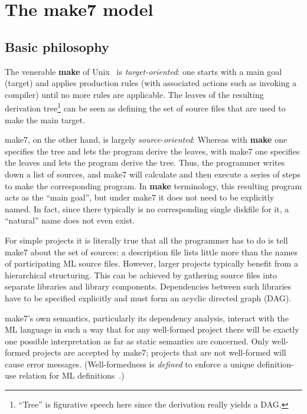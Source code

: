 
\section{The make7 model}

\subsection{Basic philosophy}

The venerable {\bf make} of Unix~\cite{feldman79} is {\em
target-oriented}\/: one starts with a main goal (target) and applies
production rules (with associated actions such as invoking a compiler)
until no more rules are applicable. The leaves of the resulting
derivation tree\footnote{``Tree'' is figurative speech here since the
derivation really yields a DAG.} can be seen as defining the set of
source files that are used to make the main target.

make7, on the other hand, is largely {\em source-oriented}\/: Whereas
with {\bf make} one specifies the tree and lets the program derive the
leaves, with make7 one specifies the leaves and lets the program derive
the tree.  Thus, the programmer writes down a list of sources, and make7
will calculate and then execute a series of steps to make the
corresponding program.  In {\bf make} terminology, this resulting
program acts as the ``main goal'', but under make7 it does not need to be
explicitly named.  In fact, since there typically is no corresponding
single diskfile for it, a ``natural'' name does not even exist.

For simple projects it is literally true that all the programmer has
to do is tell make7 about the set of sources: a description file lists
little more than the names of participating ML source files. However,
larger projects typically benefit from a hierarchical structuring.
This can be achieved by gathering source files into separate
libraries and library components.  Dependencies between such libraries
have to be specified explicitly and must form an acyclic directed
graph (DAG).

make7's own semantics, particularly its dependency analysis, interact
with the ML language in such a way that for any well-formed project
there will be exactly one possible interpretation as far as static
semantics are concerned.  Only well-formed projects are accepted by
make7; projects that are not well-formed will cause error messages.
(Well-formedness is {\em defined} to enforce a unique definition-use
relation for ML definitions~\cite{blume:depend99}.)

